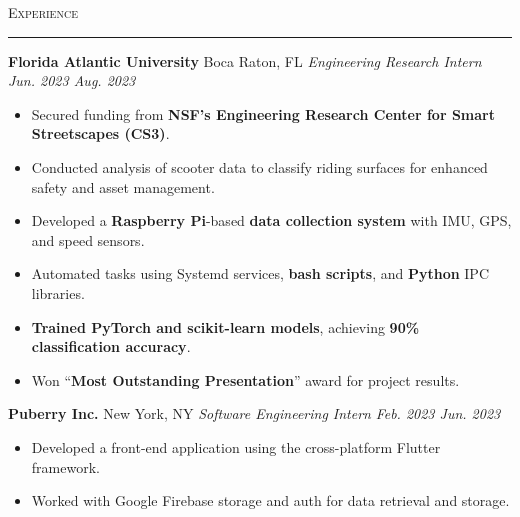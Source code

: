 \documentclass[11pt,letterpaper]{article}
\begin{document}
\vspace{4pt}
\textsc{\large{Experience}} 
\vspace{4pt}
\hrule
\begin{list}{}{\setlength{\leftmargin}{1em}\setlength{\rightmargin}{2pt}}
  
    \item
          \textbf{Florida Atlantic University} \hfill Boca Raton, FL
          \vspace{2pt} \newline
          \small{\textit{Engineering Research Intern}} \hfill \small{\textit{Jun. 2023 \textendash \space Aug. 2023}}
          \vspace{0pt}
          \begin{itemize}[itemsep=-4pt, topsep=-2pt]
              \item Secured funding from \textbf{NSF's Engineering Research Center for Smart Streetscapes (CS3)}.
              \item Conducted analysis of scooter data to classify riding surfaces for enhanced safety and asset management.
              \item Developed a \textbf{Raspberry Pi}-based \textbf{data collection system} with IMU, GPS, and speed sensors.
              \item Automated tasks using Systemd services, \textbf{bash scripts}, and \textbf{Python} IPC libraries.
              \item \textbf{Trained PyTorch and scikit-learn models}, achieving \textbf{90\% classification accuracy}.
              \item Won ``\textbf{Most Outstanding Presentation}'' award for project results.
          \end{itemize}

    \item
          \textbf{Puberry Inc.} \hfill New York, NY
          \vspace{2pt} \newline
          \small{\textit{Software Engineering Intern}} \hfill \small{\textit{Feb. 2023 \textendash \space Jun. 2023}}
          \vspace{0pt}
          \begin{itemize}[itemsep=-4pt, topsep=-2pt]
              \item Developed a front-end application using the cross-platform Flutter framework.
              \item Worked with Google Firebase storage and auth for data retrieval and storage.
          \end{itemize}
\end{list}
\end{document}
